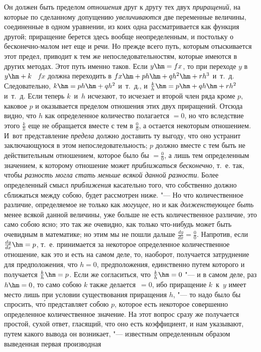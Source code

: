 Он должен быть пределом {\em отношения} друг к другу тех двух {\em приращений},
на которые по сделанному допущению {\em увеличиваются} две переменные величины,
соединенные в одном уравнении, из коих одна рассматривается как функция другой;
приращение берется здесь вообще неопределенным, и постольку о бесконечно-малом
нет еще и речи. Но прежде всего путь, которым отыскивается этот предел,
приводит к тем же непоследовательностям, которые имеются в других методах. Этот
путь именно таков. Если $y\hm=fx$, то при переходе $y$ в $y\hm+k$ \  $fx$
должна переходить в $fx\hm+ph\hm+qh^2\hm+rh^3$ и~т.~д. Следовательно,
$k\hm=ph\hm+qh^2$ и~т.~д., и $\frac k h\hm=p\hm+qh\hm+rh^2$ и~т.~д. Если теперь
$k$~и~$h$ исчезают, то исчезает и второй член ряда кроме $p$, каковое $p$ и
оказывается пределом отношения этих двух приращений. Отсюда видно, что $h$ как
определенное количество полагается $=0$, но что вследствие этого $\frac k h$
еще не обращается вместе с тем в $\frac 0 0$, а остается некоторым отношением.
И~вот представление {\em предела} должно доставить ту выгоду, что оно устранит
заключающуюся в этом непоследовательность; $p$ должно вместе с тем быть не
действительным отношением, которое было бы $=\frac 0 0$, а лишь тем
определенным значением, к которому отношение может
{\em приближаться бесконечно}, т.~е. так, чтобы {\em разность могла стать
меньше всякой данной разности}. Более определенный смысл {\em приближения}
касательно того, что собственно должно сближаться между собою, будет рассмотрен
ниже. "--- Но что количественное различие, определяемое не только как {\em
могущее}, но и как {\em долженствующее быть} менее всякой данной величины, уже
больше не есть количественное различие, это само собою ясно; это так же
очевидно, как только что-нибудь может быть очевидным в математике; но этим мы
не пошли дальше $\frac{dy}{dx}=\frac 0 0$. Напротив, если $\frac{dy}{dx}\hm=p$,
т.~е. принимается за некоторое определенное количественное отношение, как это и
есть на самом деле, то, наоборот, получается затруднение для предположения, что
$h=0$, предположения, единственно путем которого и получается $\frac k h\hm=p$.
Если же согласиться, что $\frac k h\hm=0$ "--- и в самом деле, раз $h\hm=0$, то
само собою $k$ также делается~$=0$, ибо приращение $k$~к~$y$ имеет место лишь
при условии существования приращения $h$, "--- то надо было бы спросить,
чт\'{о} представляет собою $p$, которое есть некоторое совершенно определенное
количественное значение. На этот вопрос сразу же получается простой, сухой
ответ, гласящий, что оно есть коэффициент, и нам указывают, путем какого вывода
он возникает, "--- известным определенным образом выведенная первая производная
